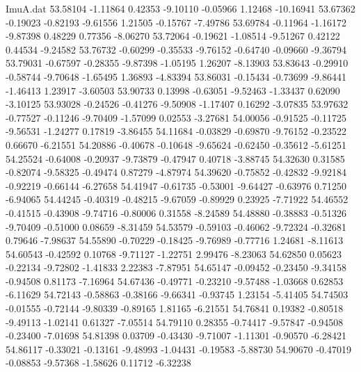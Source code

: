 \begin{filecontents}{ImuA.dat}
  53.58104   -1.11864    0.42353   -9.10110   -0.05966    1.12468  -10.16941
  53.67362   -0.19023   -0.82193   -9.61556    1.21505   -0.15767   -7.49786
  53.69784   -0.11964   -1.16172   -9.87398    0.48229    0.77356   -8.06270
  53.72064   -0.19621   -1.08514   -9.51267    0.42122    0.44534   -9.24582
  53.76732   -0.60299   -0.35533   -9.76152   -0.64740   -0.09660   -9.36794
  53.79031   -0.67597   -0.28355   -9.87398   -1.05195    1.26207   -8.13903
  53.83643   -0.29910   -0.58744   -9.70648   -1.65495    1.36893   -4.83394
  53.86031   -0.15434   -0.73699   -9.86441   -1.46413    1.23917   -3.60503
  53.90733    0.13998   -0.63051   -9.52463   -1.33437    0.62090   -3.10125
  53.93028   -0.24526   -0.41276   -9.50908   -1.17407    0.16292   -3.07835
  53.97632   -0.77527   -0.11246   -9.70409   -1.57099    0.02553   -3.27681
  54.00056   -0.91525   -0.11725   -9.56531   -1.24277    0.17819   -3.86455
  54.11684   -0.03829   -0.69870   -9.76152   -0.23522    0.66670   -6.21551
  54.20886   -0.40678   -0.10648   -9.65624   -0.62450   -0.35612   -5.61251
  54.25524   -0.64008   -0.20937   -9.73879   -0.47947    0.40718   -3.88745
  54.32630    0.31585   -0.82074   -9.58325   -0.49474    0.87279   -4.87974
  54.39620   -0.75852   -0.42832   -9.92184   -0.92219   -0.66144   -6.27658
  54.41947   -0.61735   -0.53001   -9.64427   -0.63976    0.71250   -6.94065
  54.44245   -0.40319   -0.48215   -9.67059   -0.89929    0.23925   -7.71922
  54.46552   -0.41515   -0.43908   -9.74716   -0.80006    0.31558   -8.24589
  54.48880   -0.38883   -0.51326   -9.70409   -0.51000    0.08659   -8.31459
  54.53579   -0.59103   -0.46062   -9.72324   -0.32681    0.79646   -7.98637
  54.55890   -0.70229   -0.18425   -9.76989   -0.77716    1.24681   -8.11613
  54.60543   -0.42592    0.10768   -9.71127   -1.22751    2.99476   -8.23063
  54.62850    0.05623   -0.22134   -9.72802   -1.41833    2.22383   -7.87951
  54.65147   -0.09452   -0.23450   -9.34158   -0.94508    0.81173   -7.16964
  54.67436   -0.49771   -0.23210   -9.57488   -1.03668    0.62853   -6.11629
  54.72143   -0.58863   -0.38166   -9.66341   -0.93745    1.23154   -5.41405
  54.74503   -0.01555   -0.72144   -9.80339   -0.89165    1.81165   -6.21551
  54.76841    0.19382   -0.80518   -9.49113   -1.02141    0.61327   -7.05514
  54.79110    0.28355   -0.74417   -9.57847   -0.94508   -0.23400   -7.01698
  54.81398    0.03709   -0.43430   -9.71007   -1.11301   -0.90570   -6.28421
  54.86117   -0.33021   -0.13161   -9.48993   -1.04431   -0.19583   -5.88730
  54.90670   -0.47019   -0.08853   -9.57368   -1.58626    0.11712   -6.32238

\end{filecontents}
